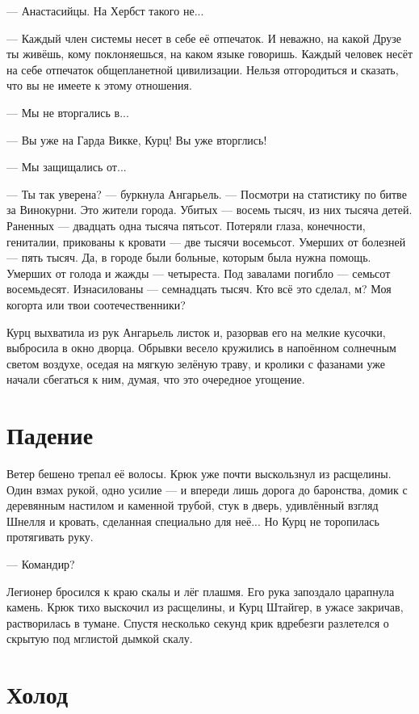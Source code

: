 --- Анастасийцы.
На Хербст такого не...

--- Каждый член системы несет в себе её отпечаток.
И неважно, на какой Друзе ты живёшь, кому поклоняешься, на каком языке говоришь.
Каждый человек несёт на себе отпечаток общепланетной цивилизации.
Нельзя отгородиться и сказать, что вы не имеете к этому отношения.

--- Мы не вторгались в...

--- Вы уже на Гарда Викке, Курц!
Вы уже вторглись!

--- Мы защищались от...

--- Ты так уверена? --- буркнула Ангарьель.
--- Посмотри на статистику по битве за Винокурни.
Это жители города.
Убитых --- восемь тысяч, из них тысяча детей.
Раненных --- двадцать одна тысяча пятьсот.
Потеряли глаза, конечности, гениталии, прикованы к кровати --- две тысячи восемьсот.
Умерших от болезней --- пять тысяч.
Да, в городе были больные, которым была нужна помощь.
Умерших от голода и жажды --- четыреста.
Под завалами погибло --- семьсот восемьдесят.
Изнасилованы --- семнадцать тысяч.
Кто всё это сделал, м?
Моя когорта или твои соотечественники?

Курц выхватила из рук Ангарьель листок и, разорвав его на мелкие кусочки, выбросила в окно дворца.
Обрывки весело кружились в напоённом солнечным светом воздухе, оседая на мягкую зелёную траву, и кролики с фазанами уже начали сбегаться к ним, думая, что это очередное угощение.

\section{Падение}

Ветер бешено трепал её волосы.
Крюк уже почти выскользнул из расщелины.
Один взмах рукой, одно усилие --- и впереди лишь дорога до баронства, домик с деревянным настилом и каменной трубой, стук в дверь, удивлённый взгляд Шнелля и кровать, сделанная специально для неё...
Но Курц не торопилась протягивать руку.

--- Командир?

Легионер бросился к краю скалы и лёг плашмя.
Его рука запоздало царапнула камень.
Крюк тихо выскочил из расщелины, и Курц Штайгер, в ужасе закричав, растворилась в тумане.
Спустя несколько секунд крик вдребезги разлетелся о скрытую под мглистой дымкой скалу.

\section{Холод}

